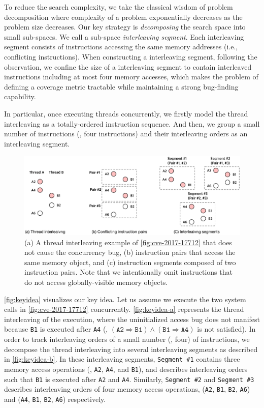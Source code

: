 To reduce the search complexity, we take the classical wisdom of problem decomposition where 
complexity of a problem exponentially decreases as the problem size decreases.
Our key strategy is \textit{decomposing} the search space into 
small sub-spaces. We call a sub-space \textit{interleaving segment}.
Each interleaving segment consists of instructions accessing 
the same memory addresses (i.e., conflicting instructions).
When constructing a interleaving segment, following the observation, 
we confine the size of a interleaving segment 
to contain interleaved instructions including at most four memory accesses,
which makes the problem of defining a coverage metric tractable while maintaining a strong bug-finding capability.

%
In particular, once executing threads concurrently, we firstly model
the thread interleaving as a totally-ordered instruction sequence.
%
And then, we group a small number of instructions (\eg, four
instructions) and their interleaving orders as an interleaving segment.


\begin{figure}[t]
  \centering
  \includegraphics[width=0.9\linewidth]{fig/intuition.pdf}
  \caption{(a) A thread interleaving example of
    \autoref{fig:cve-2017-17712} that does not cause the concurrency
    bug, (b) instruction pairs that access the same memory object,
    and (c) instruction segments composed of two instruction pairs.
    Note that we intentionally omit instructions that do not access
    globally-visible memory objects.}
  \label{fig:keyidea}
\end{figure}
%
\autoref{fig:keyidea} visualizes our key idea.
%
Let us assume we execute the two system calls in
\autoref{fig:cve-2017-17712} concurrently.
%
\autoref{fig:keyidea-a} represents the thread interleaving of the
execution, where the uninitialized access bug does not manifest
because \texttt{B1} is executed after \texttt{A4} (\ie,
$(\texttt{A2} \Rightarrow \texttt{B1}) \wedge (\texttt{B1} \Rightarrow
\texttt{A4})$ is not satisfied).
%
In order to track interleaving orders of a small number (\eg, four) of
instructions, we decompose the thread interleaving into several
interleaving segments as described in \autoref{fig:keyidea-b}.
%
In these interleaving segments, \texttt{Segment \#1} contains three
memory access operations (\ie, \texttt{A2}, \texttt{A4}, and
\texttt{B1}), and describes interleaving orders such that \texttt{B1}
is executed after \texttt{A2} and \texttt{A4}.
%
Similarly, \texttt{Segment \#2} and \texttt{Segment \#3} describes
interleaving orders of four memory access operations, (\texttt{A2},
\texttt{B1}, \texttt{B2}, \texttt{A6}) and (\texttt{A4}, \texttt{B1},
\texttt{B2}, \texttt{A6}) respectively.
%


